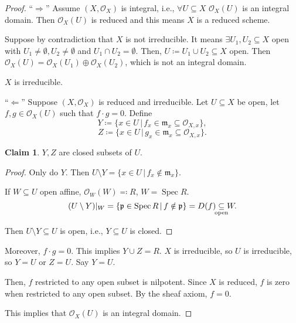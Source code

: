 \documentclass[12pt]{article}
\DeclareMathOperator{\Spec}{Spec}
\theoremstyle{definition}
\newtheorem*{claim}{Claim}
\begin{document}
\begin{proof}
``$\Rightarrow$'' Assume $(X,\mathcal{O}_X)$ is integral, i.e., $\forall U\subseteq X$ $\mathcal{O}_X(U)$ is an integral domain. Then $\mathcal{O}_X(U)$ is reduced and this means $X$ is a reduced scheme.

Suppose by contradiction that $X$ is not irreducible. It means $\exists U_1,U_2\subseteq X$ open with $U_1\neq\emptyset,U_2\neq\emptyset$ and $U_1\cap U_2=\emptyset$. Then, $U\coloneqq U_1\cup U_2\subseteq X$ open. Then $\mathcal{O}_X(U)=\mathcal{O}_X(U_1)\oplus\mathcal{O}_X(U_2)$, which is not an integral domain. \Lightning

$X$ is irreducible.

``$\Leftarrow$'' Suppose $(X,\mathcal{O}_X)$ is reduced and irreducible. Let $U\subseteq X$ be open, let $f,g\in\mathcal{O}_X(U)$ such that $f\cdot g=0$. Define
\[Y\coloneqq\{x\in U\,|\,f_x\in\mathfrak{m}_x\subseteq\mathcal{O}_{X,x}\},\]
\[Z\coloneqq\{x\in U\,|\,g_x\in\mathfrak{m}_x\subseteq\mathcal{O}_{X,x}\}.\]

\begin{claim}
$Y,Z$ are closed subsets of $U$.
\end{claim}

\begin{proof}
Only do $Y$. Then $U\setminus Y=\{x\in U\,|\,f_x\notin\mathfrak{m}_x\}$.

If $W\subseteq U$ open affine, $\mathcal{O}_W(W)\eqqcolon R$, $W=\Spec R$.
\[(U\setminus Y)|_W=\{\mathfrak{p}\in\Spec R\,|\,f\notin\mathfrak{p}\}=D(f)\underset{\mathclap{\text{open}}}{\subseteq}W.\]

Then $U\setminus Y\subseteq U$ is open, i.e., $Y\subseteq U$ is closed.
\end{proof}

Moreover, $f\cdot g=0$. This implies $Y\cup Z=R$. $X$ is irreducible, so $U$ is irreducible, so $Y=U$ or $Z=U$. Say $Y=U$.

Then, $f$ restricted to any open subset is nilpotent. Since $X$ is reduced, $f$ is zero when restricted to any open subset. By the sheaf axiom, $f=0$.

This implies that $\mathcal{O}_X(U)$ is an integral domain.
\end{proof}
\end{document}
